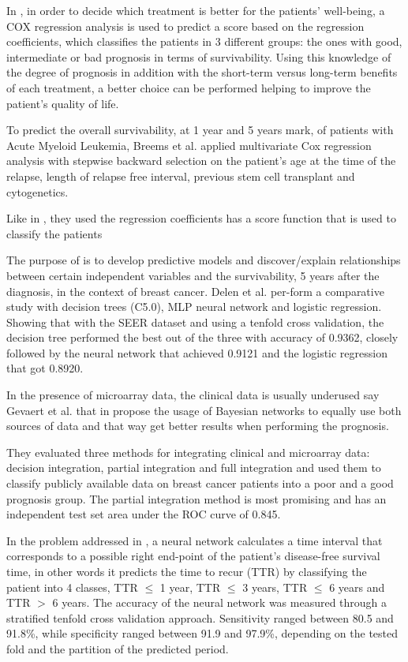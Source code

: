 In \cite{Steyerberg2005}, in order to decide which treatment is better for the patients’ well-being, a COX regression analysis
 is used to predict a score based on the regression coefficients, which classifies the patients in 3 different groups: the ones
 with good, intermediate or bad prognosis in terms of survivability. Using this knowledge of the degree of prognosis in addition
 with the short-term versus long-term benefits of each treatment, a better choice can be performed helping to improve the patient’s quality of life. 

To predict the overall survivability, at 1 year and 5 years mark, of patients with Acute Myeloid Leukemia, Breems et al. applied 
multivariate Cox regression analysis with stepwise backward selection on the patient’s age at the time of the relapse, length of relapse 
free interval, previous stem cell transplant and cytogenetics. 

Like in \cite{Steyerberg2005}, they used the regression coefficients has a score function that is used to classify the patients \cite{Breems2005}

The purpose of \cite{Delen2005} is to develop predictive models and discover/explain relationships between certain independent variables and the
 survivability, 5 years after the diagnosis, in the context of breast cancer. Delen et al. per-form a comparative study with decision trees (C5.0),
 MLP neural network and logistic regression. Showing that with the SEER dataset and using a tenfold cross validation, the decision tree performed 
 the best out of the three with accuracy of 0.9362, closely followed by the neural network that achieved 0.9121 and the logistic regression that
 got 0.8920.

In the presence of microarray data, the clinical data is usually underused say Gevaert et al. that in \cite{Gevaert2006} propose the usage of Bayesian 
networks to equally use both sources of data and that way get better results when performing the prognosis. 

They evaluated three methods for integrating clinical and microarray data: decision integration, partial integration and full integration 
and used them to classify publicly available data on breast cancer patients into a poor and a good prognosis group. The partial integration
 method is most promising and has an independent test set area under the ROC curve of 0.845.

In the problem addressed in \cite{Anagnostopoulos2006}, a neural network calculates a time interval that corresponds to a possible right
 end-point of the patient’s disease-free survival time, in other words it predicts the time to recur (TTR) by classifying the patient into 
 4 classes, TTR $\leq$ 1 year, TTR $\leq$ 3 years, TTR $\leq$ 6 years and TTR $>$ 6 years. The accuracy of the neural network was measured through a
 stratified tenfold cross validation approach. Sensitivity ranged between 80.5 and 91.8\%, while specificity ranged between 91.9 and 97.9\%,
 depending on the tested fold and the partition of the predicted period. 


